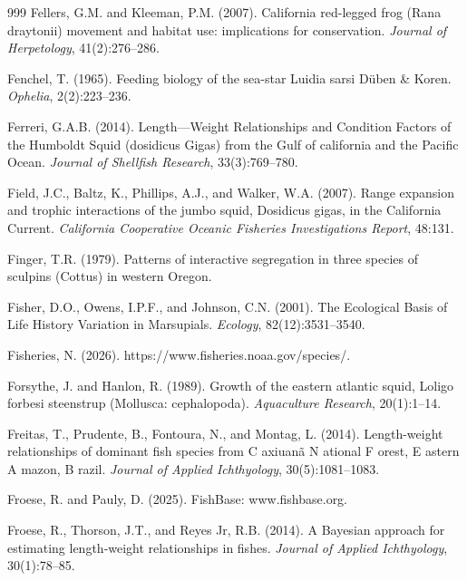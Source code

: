 \begin{thebibliography}{999}
Fellers, G.M. and Kleeman, P.M. (2007). California red-legged frog (Rana draytonii) movement and habitat use: implications for conservation. \textit{Journal of Herpetology}, 41(2):276--286.

Fenchel, T. (1965). Feeding biology of the sea-star Luidia sarsi D{\"u}ben \& Koren. \textit{Ophelia}, 2(2):223--236.

Ferreri, G.A.B. (2014). Length---Weight Relationships and Condition Factors of the Humboldt Squid (dosidicus Gigas) from the Gulf of california and the Pacific Ocean. \textit{Journal of Shellfish Research}, 33(3):769--780.

Field, J.C., Baltz, K., Phillips, A.J., and Walker, W.A. (2007). Range expansion and trophic interactions of the jumbo squid, Dosidicus gigas, in the California Current. \textit{California Cooperative Oceanic Fisheries Investigations Report}, 48:131.

Finger, T.R. (1979). Patterns of interactive segregation in three species of sculpins (Cottus) in western Oregon.

Fisher, D.O., Owens, I.P.F., and Johnson, C.N. (2001). The Ecological Basis of Life History Variation in Marsupials. \textit{Ecology}, 82(12):3531--3540.

Fisheries, N. (2026). https://www.fisheries.noaa.gov/species/.

Forsythe, J. and Hanlon, R. (1989). Growth of the eastern atlantic squid, Loligo forbesi steenstrup (Mollusca: cephalopoda). \textit{Aquaculture Research}, 20(1):1--14.

Freitas, T., Prudente, B., Fontoura, N., and Montag, L. (2014). Length-weight relationships of dominant fish species from C axiuan{\~a} N ational F orest, E astern A mazon, B razil. \textit{Journal of Applied Ichthyology}, 30(5):1081--1083.

Froese, R. and Pauly, D. (2025). {F}ish{B}ase: www.fishbase.org.

Froese, R., Thorson, J.T., and Reyes Jr, R.B. (2014). A Bayesian approach for estimating length-weight relationships in fishes. \textit{Journal of Applied Ichthyology}, 30(1):78--85.


\end{thebibliography}
